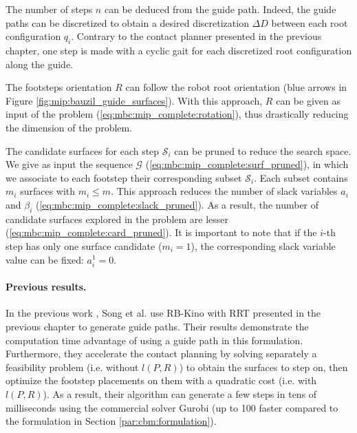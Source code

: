 The number of steps $n$ can be deduced from the guide path.
Indeed, the guide paths can be discretized to obtain a desired discretization $\Delta D$ between each root configuration $q_i$.
Contrary to the contact planner presented in the previous chapter, one step is made with a cyclic gait for each discretized root configuration along the guide.

The footsteps orientation $R$ can follow the robot root orientation (blue arrows in Figure \ref{fig:mip:bauzil_guide_surfaces}).
With this approach, $R$ can be given as input of the problem (\ref{eq:mbc:mip_complete:rotation}), thus drastically reducing the dimension of the problem.

The candidate surfaces for each step $\mathcal{S}_i$ can be pruned to reduce the search space.
We give as input the sequence $\mathcal{G}$ (\ref{eq:mbc:mip_complete:surf_pruned}), in which we associate to each footstep their corresponding subset $\mathcal{S}_i$. Each subset contains $m_i$ surfaces with $m_i \leq m$. 
This approach reduces the number of slack variables $a_i$ and $\beta_i$ (\ref{eq:mbc:mip_complete:slack_pruned}).
As a result, the number of candidate surfaces explored in the problem are lesser (\ref{eq:mbc:mip_complete:card_pruned}).
It is important to note that if the $i$-th step has only one surface candidate ($m_i=1$), the corresponding slack variable value can be fixed: $a_i^1 = 0$.

\paragraph{Previous results.}
In the previous work \cite{sl1m_v2}, Song et al. use RB-Kino with RRT \cite{kinodynamic_sm_2017} presented in the previous chapter to generate guide paths.
Their results demonstrate the computation time advantage of using a guide path in this formulation. 
Furthermore, they accelerate the contact planning by solving separately a feasibility problem (i.e. without $l(P,R)$) to obtain the surfaces to step on, then optimize the footstep placements on them with a quadratic cost (i.e. with $l(P,R)$).
As a result, their algorithm can generate a few steps in tens of milliseconds using the commercial solver Gurobi \cite{gurobi} (up to 100 faster compared to the formulation in Section \ref{par:cbm:formulation}).

